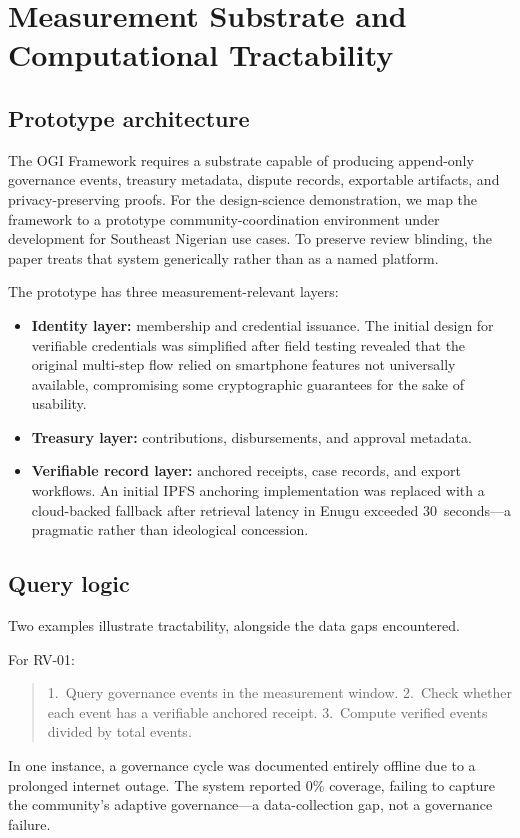 \documentclass[sigconf,anonymous]{acmart}
\begin{document}
\section{Measurement Substrate and Computational Tractability}

\subsection{Prototype architecture}

The OGI Framework requires a substrate capable of producing append-only governance events, treasury metadata, dispute records, exportable artifacts, and privacy-preserving proofs. For the design-science demonstration, we map the framework to a prototype community-coordination environment under development for Southeast Nigerian use cases. To preserve review blinding, the paper treats that system generically rather than as a named platform.

The prototype has three measurement-relevant layers:
\begin{itemize}
\item \textbf{Identity layer:} membership and credential issuance. The initial design for verifiable credentials was simplified after field testing revealed that the original multi-step flow relied on smartphone features not universally available, compromising some cryptographic guarantees for the sake of usability.
\item \textbf{Treasury layer:} contributions, disbursements, and approval metadata.
\item \textbf{Verifiable record layer:} anchored receipts, case records, and export workflows. An initial IPFS anchoring implementation was replaced with a cloud-backed fallback after retrieval latency in Enugu exceeded 30~seconds---a pragmatic rather than ideological concession.
\end{itemize}

\subsection{Query logic}

Two examples illustrate tractability, alongside the data gaps encountered.

For RV-01:
\begin{quote}
1.~Query governance events in the measurement window.
2.~Check whether each event has a verifiable anchored receipt.
3.~Compute verified events divided by total events.
\end{quote}
In one instance, a governance cycle was documented entirely offline due to a prolonged internet outage. The system reported 0\% coverage, failing to capture the community's adaptive governance---a data-collection gap, not a governance failure.
\end{document}
